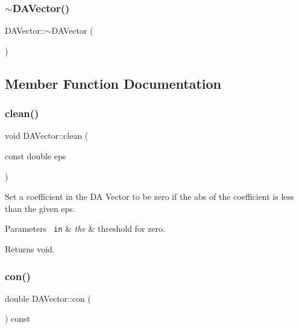 \subsubsection{\texorpdfstring{$\sim$DAVector()}{~DAVector()}}
{\footnotesize\ttfamily D\+A\+Vector\+::$\sim$\+D\+A\+Vector (\begin{DoxyParamCaption}{ }\end{DoxyParamCaption})}



\subsection{Member Function Documentation}
\mbox{\label{struct_d_a_vector_a0afc5d4068338660737f5132caedce6c}} 
\subsubsection{\texorpdfstring{clean()}{clean()}}
{\footnotesize\ttfamily void D\+A\+Vector\+::clean (\begin{DoxyParamCaption}\item[{const double}]{eps }\end{DoxyParamCaption})}



Set a coefficient in the DA Vector to be zero if the abs of the coefficient is less than the given eps. 


\begin{DoxyParams}[1]{Parameters}
\mbox{\texttt{ in}}  & {\em the} & threshold for zero. \\
\hline
\end{DoxyParams}
\begin{DoxyReturn}{Returns}
void. 
\end{DoxyReturn}
\mbox{\label{struct_d_a_vector_a00ef34ddb1dce8bead6d43a24b3fb23e}} 
\subsubsection{\texorpdfstring{con()}{con()}}
{\footnotesize\ttfamily double D\+A\+Vector\+::con (\begin{DoxyParamCaption}{ }\end{DoxyParamCaption}) const}

